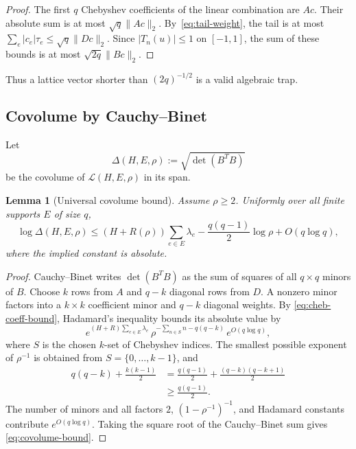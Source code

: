 \documentclass[11pt,oneside]{article}
\newtheorem{lemma}[theorem]{Lemma}
\theoremstyle{definition}
\theoremstyle{remark}
\newcommand{\cL}{\mathcal L}
\begin{document}
\begin{proof}
The first $q$ Chebyshev coefficients of the linear combination are $Ac$.  Their absolute sum
is at most $\sqrt q\|Ac\|_2$.  By~\eqref{eq:tail-weight}, the tail is at most
$\sum_e|c_e|\tau_e\le\sqrt q\|Dc\|_2$.  Since $|T_n(u)|\le1$ on $[-1,1]$, the sum of these
bounds is at most $\sqrt{2q}\|Bc\|_2$.
\end{proof}

Thus a lattice vector shorter than $(2q)^{-1/2}$ is a valid algebraic trap.

\subsection{Covolume by Cauchy--Binet}

Let
\[
 \Delta(H,E,\rho):=\sqrt{\det(B^TB)}
\]
be the covolume of $\cL(H,E,\rho)$ in its span.

\begin{lemma}[Universal covolume bound]
\label{lem:covolume}
Assume $\rho\ge2$.  Uniformly over all finite supports $E$ of size $q$,
\begin{equation}
 \log\Delta(H,E,\rho)
 \le (H+R(\rho))\sum_{e\in E}\lambda_e
      -\frac{q(q-1)}2\log\rho+O(q\log q),
 \label{eq:covolume-bound}
\end{equation}
where the implied constant is absolute.
\end{lemma}

\begin{proof}
Cauchy--Binet writes $\det(B^TB)$ as the sum of squares of all $q\times q$ minors of $B$.
Choose $k$ rows from $A$ and $q-k$ diagonal rows from $D$.  A nonzero minor factors into a
$k\times k$ coefficient minor and $q-k$ diagonal weights.  By
\eqref{eq:cheb-coeff-bound}, Hadamard's inequality bounds its absolute value by
\[
 e^{(H+R)\sum_{e\in E}\lambda_e}\,
 \rho^{-\sum_{n\in S}n-q(q-k)}\,e^{O(q\log q)},
\]
where $S$ is the chosen $k$-set of Chebyshev indices.  The smallest possible exponent of
$\rho^{-1}$ is obtained from $S=\{0,\ldots,k-1\}$, and
\begin{align*}
 q(q-k)+\frac{k(k-1)}2
 &=\frac{q(q-1)}2+\frac{(q-k)(q-k+1)}2\\
 &\ge\frac{q(q-1)}2.
\end{align*}
The number of minors and all factors $2$, $(1-\rho^{-1})^{-1}$, and Hadamard constants
contribute $e^{O(q\log q)}$.  Taking the square root of the Cauchy--Binet sum gives
\eqref{eq:covolume-bound}.
\end{proof}
\end{document}
